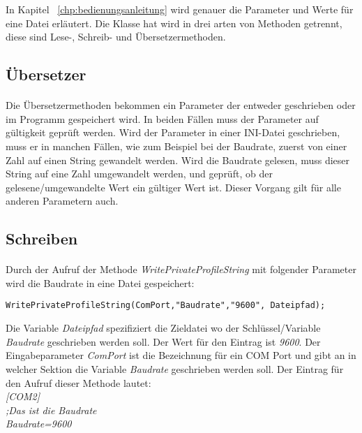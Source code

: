 In Kapitel ~\ref{chp:bedienungsanleitung} wird genauer die Parameter und Werte für eine Datei erläutert. Die Klasse hat wird in drei arten von Methoden getrennt, diese sind Lese-, Schreib- und Übersetzermethoden.\\

\subsection{Übersetzer}
\paragraph{}
Die Übersetzermethoden bekommen ein Parameter der entweder geschrieben oder im Programm gespeichert wird. In beiden Fällen muss der Parameter auf gültigkeit geprüft werden. Wird der Parameter in einer INI-Datei geschrieben, muss er in manchen Fällen, wie zum Beispiel bei der Baudrate, zuerst von einer Zahl auf einen String gewandelt werden. Wird die Baudrate gelesen, muss dieser String auf eine Zahl umgewandelt werden, und geprüft, ob der gelesene/umgewandelte Wert ein gültiger Wert ist. Dieser Vorgang gilt für alle anderen Parametern auch.



\subsection{Schreiben}
\paragraph{}
Durch der Aufruf der Methode \textit{WritePrivateProfileString} mit folgender Parameter wird die Baudrate in eine Datei gespeichert:\\

\begin{lstlisting}
WritePrivateProfileString(ComPort,"Baudrate","9600", Dateipfad);
\end{lstlisting}

Die Variable \textit{Dateipfad} spezifiziert die Zieldatei wo der Schlüssel/Variable \textit{Baudrate} geschrieben werden soll. Der Wert für den Eintrag ist \textit{9600}. Der Eingabeparameter \textit{ComPort} ist die Bezeichnung für ein COM Port und gibt an in welcher Sektion die Variable \textit{Baudrate} geschrieben werden soll. Der Eintrag für den Aufruf dieser Methode lautet:\\

\hspace*{20mm}\textit{[COM2]}    \\
\hspace*{20mm}\textit{;Das ist die Baudrate}    \\
\hspace*{20mm}\textit{Baudrate=9600}\\

